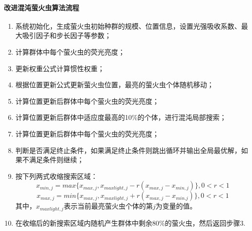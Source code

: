 \documentclass[UTF8]{ctexart}
\begin{document}
				\paragraph{改进混沌萤火虫算法流程}
					\begin{enumerate}
						\item 系统初始化，生成萤火虫初始种群的规模、位置信息，设置光强吸收系数、最大吸引因子和步长因子等参数；
						\item  计算群体中每个萤火虫的荧光亮度；
						\item  更新权重公式计算惯性权重；
						\item  根据位置更新公式更新萤火虫位置，最亮的萤火虫个体随机移动；
						\item  计算位置更新后群体中每个萤火虫的荧光亮度；
						\item 计算位置更新后群体中适应度最高的10\%的个体，进行混沌局部搜索；
						\item  计算位置更新后群体中每个萤火虫的荧光亮度；
						\item 判断是否满足终止条件，如果满足终止条件则跳出循环并输出全局最优解，如果不满足条件则继续；
						\item 按下列两式收缩搜索区域：
 							$$x_{min,j}=max\{x_{max,j},x_{maxlight,j}-r(x_{max,j}-x_{min,j})\}, 0<r<1$$
 							$$x_{max,j}=min\{x_{max,j},x_{maxlight,j}+r(x_{max,j}-x_{min.j})\},0<r<1$$
 							其中，$x_{maxlight,j}$表示当前最亮萤火虫个体的第$j$为变量的值。
						\item 在收缩后的新搜索区域内随机产生群体中剩余80\%的萤火虫，然后返回步骤3.
					\end{enumerate}
\end{document}
